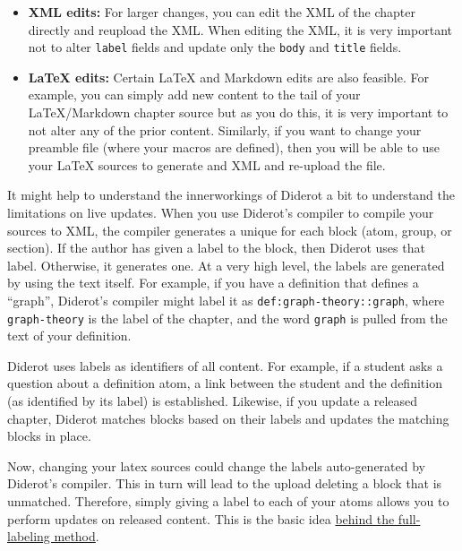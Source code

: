 \begin{gram}
\begin{itemize}
\item \textbf{XML edits:}
%
For larger changes, you can edit the XML of the chapter directly and
reupload the XML.  When editing the XML, it is very important not to
alter \lstinline`label` fields and update only the \lstinline`body` and \lstinline`title` fields.

\item \textbf{LaTeX edits:}
Certain LaTeX and Markdown edits are also feasible. 
%
For example, you can simply add new content to the tail of your LaTeX/Markdown chapter source but as you do this, it is very important to not alter any of the prior content. 
%
Similarly, if you want to change your preamble file (where your macros are defined), then you will be able to use your LaTeX sources to generate and XML and re-upload the file. 
\end{itemize}
\end{gram}

\begin{gram}
It might help to understand the innerworkings of Diderot a bit to understand the limitations on live updates.
%
When you use Diderot's compiler to compile your sources to XML, the compiler generates a unique  for each block (atom, group, or section).  
%
If the author has given a label to the block, then Diderot uses that label.
%
Otherwise, it generates one.
%
At a very high level, the labels are generated by using the text itself.  For example, if you have a definition that defines a ``graph'', Diderot's compiler might label it as \lstinline`def:graph-theory::graph`, where  
%
\lstinline`graph-theory` is the label of the chapter,
%
and the word \lstinline`graph` is pulled from the text of your definition.
%

Diderot uses labels as identifiers of all content.
%
For example, if a student asks a question about a definition atom, a link between the student and the definition (as identified by its label) is established.  
%
Likewise, if you update a released chapter, Diderot matches blocks based on their labels and updates the matching blocks in place.

Now, changing your latex sources could change the labels auto-generated by Diderot's compiler.  This in turn will lead to the upload deleting a block that is unmatched.
%
Therefore, simply giving a label to each of your atoms allows you to perform updates on released content.
%
This is the basic idea \href{sec:publish::full-labeling}{behind the full-labeling method}.
\end{gram}

